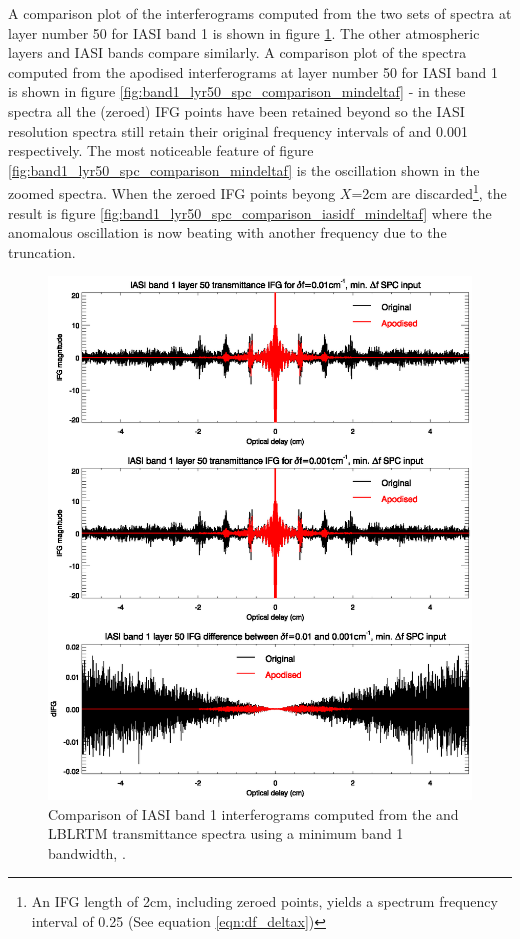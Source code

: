 A comparison plot of the interferograms computed from the two sets of spectra at layer number 50 for IASI band 1 is shown in figure \ref{fig:band1_lyr50_ifg_comparison_mindeltaf}. The other atmospheric layers and IASI bands compare similarly. A comparison plot of the spectra computed from the apodised interferograms at layer number 50 for IASI band 1 is shown in figure  \ref{fig:band1_lyr50_spc_comparison_mindeltaf} - in these spectra all the (zeroed) IFG points have been retained beyond \Xeff{} so the IASI resolution spectra still retain their original frequency intervals of \invcm{} and 0.001\invcm{} respectively. The most noticeable feature of figure \ref{fig:band1_lyr50_spc_comparison_mindeltaf} is the oscillation shown in the zoomed spectra. When the zeroed IFG points beyong $X$=2cm are discarded\footnote{An IFG length of 2cm, including zeroed points, yields a spectrum frequency interval of 0.25\invcm{} (See equation \ref{eqn:df_deltax})}, the result is figure  \ref{fig:band1_lyr50_spc_comparison_iasidf_mindeltaf} where the anomalous oscillation is now beating with another frequency due to the truncation.

\begin{figure}[htp]
  \centering
  \includegraphics[scale=0.8]{graphics/band1_lyr50_ifg_comparison_mindeltaf.eps}
  \caption{Comparison of IASI band 1 interferograms computed from the  and  LBLRTM transmittance spectra using a minimum band 1 bandwidth, {\Df}.}
  \label{fig:band1_lyr50_ifg_comparison_mindeltaf}
\end{figure}

